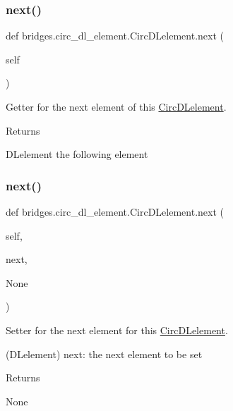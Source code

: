 \subsubsection{\texorpdfstring{next()}{next()}\hspace{0.1cm}{\footnotesize\ttfamily [1/2]}}
{\footnotesize\ttfamily def bridges.\+circ\+\_\+dl\+\_\+element.\+Circ\+D\+Lelement.\+next (\begin{DoxyParamCaption}\item[{}]{self }\end{DoxyParamCaption})}



Getter for the next element of this \mbox{\hyperlink{classbridges_1_1circ__dl__element_1_1_circ_d_lelement}{Circ\+D\+Lelement}}. 

\begin{DoxyReturn}{Returns}


D\+Lelement the following element 
\end{DoxyReturn}
\mbox{\label{classbridges_1_1circ__dl__element_1_1_circ_d_lelement_a842efa9c0ad878fe34b343600a23d9aa}} 
\subsubsection{\texorpdfstring{next()}{next()}\hspace{0.1cm}{\footnotesize\ttfamily [2/2]}}
{\footnotesize\ttfamily def bridges.\+circ\+\_\+dl\+\_\+element.\+Circ\+D\+Lelement.\+next (\begin{DoxyParamCaption}\item[{}]{self,  }\item[{}]{next,  }\item[{}]{None }\end{DoxyParamCaption})}



Setter for the next element for this \mbox{\hyperlink{classbridges_1_1circ__dl__element_1_1_circ_d_lelement}{Circ\+D\+Lelement}}. 

(D\+Lelement) next\+: the next element to be set \begin{DoxyReturn}{Returns}


None 
\end{DoxyReturn}
\mbox{\label{classbridges_1_1circ__dl__element_1_1_circ_d_lelement_aa2ebe17f407680a6a4fc886ef9516d61}} 
